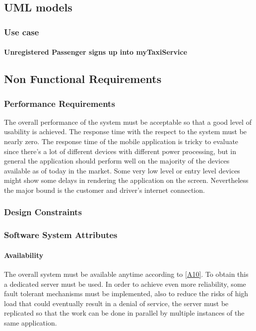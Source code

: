 \documentclass[a4paper,12pt]{article}%
\newcommand{\usecasetable}[5]{
\begin{center}
\begin{tabularx}{\textwidth}{|X|C|}
\hline
Actor & #1\\
\hline
Goal & #2\\
\hline
Event Flow & #3\\
\hline
Output Condition & #4\\
\hline
Exception & #5\\
\hline
\end{tabularx}
\end{center}
}
\begin{document}
\pagebreak
\subsection{UML models}
\subsubsection{Use case} 
\paragraph{Unregistered Passenger signs up into myTaxiService}
\pagebreak
\subsection{Non Functional Requirements}
\subsubsection{Performance Requirements}
The overall performance of the system must be acceptable so that a good level of usability is achieved.
The response time with the respect to the system must be nearly zero. The response time of the mobile application is tricky to evaluate since there's a lot of different devices with different power processing, but  in general the application should perform well on the majority of the devices available as of today in the market. Some very low level or entry level devices might show some delays in rendering the application on the screen. Nevertheless the major bound is the customer and driver's internet connection. 
\subsubsection{Design Constraints}
\subsubsection{Software System Attributes}
\paragraph{Availability} The overall system must be available anytime according to \hyperref[a10]{[A10]}. To obtain this a dedicated server must be used. In order to achieve even more reliability, some fault tolerant mechanisms must be implemented, also to reduce the risks of high load that could eventually result in a denial of service, the server must be replicated so that the work can be done in parallel by multiple instances of the same application. 
\end{document}
